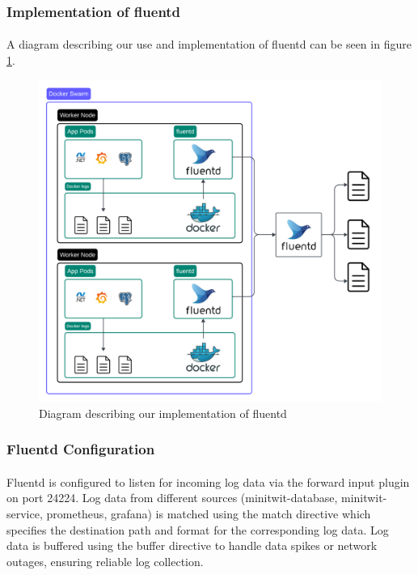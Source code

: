 \subsubsection{Implementation of fluentd}
\paragraph{} A diagram describing our use and implementation of fluentd can be seen in figure \ref{fig:logging2}.
\begin{figure}[H]
	\centering
	\includegraphics[width=1\textwidth]{Logging2.png}
	\caption{Diagram describing our implementation of fluentd}
	\label{fig:logging2}
\end{figure}

\subsubsection*{Fluentd Configuration}
\paragraph{} Fluentd is configured to listen for incoming log data via the forward input plugin on port 24224. Log data from different sources  (minitwit-database, minitwit-service, prometheus, grafana) is matched using the match directive which specifies the destination path and format for the corresponding log data. Log data is buffered using the buffer directive to handle data spikes or network outages, ensuring reliable log collection.

